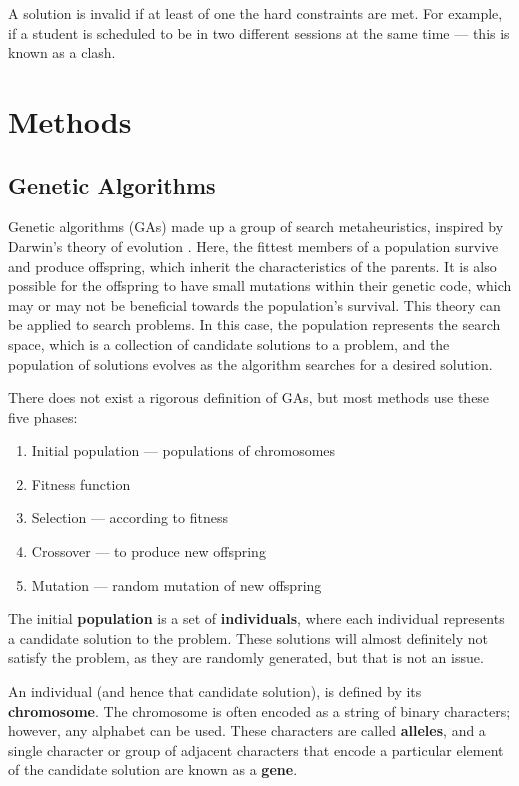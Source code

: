 \documentclass[a4paper, 12pt]{report}
\begin{document}
A solution is invalid if at least of one the hard constraints are met.
For example, if a student is scheduled to be in two different sessions at the
same time --- this is known as a clash.

\section{Methods}

\subsection{Genetic Algorithms}

Genetic algorithms (GAs) made up a group of search metaheuristics, inspired by
Darwin's theory of evolution \cite{ga_mitchell}.
Here, the fittest members of a population survive and produce offspring, which
inherit the characteristics of the parents.
It is also possible for the offspring to have small mutations within their
genetic code, which may or may not be beneficial towards the population's
survival.
This theory can be applied to search problems.
In this case, the population represents the search space, which is a collection 
of candidate solutions to a problem, and the population of solutions evolves as
the algorithm searches for a desired solution.

There does not exist a rigorous definition of GAs, but most methods use these
five phases:

\begin{enumerate}
	\item Initial population --- populations of chromosomes
	\item Fitness function
	\item Selection --- according to fitness
	\item Crossover --- to produce new offspring
	\item Mutation --- random mutation of new offspring
\end{enumerate}

The initial \textbf{population} is a set of \textbf{individuals}, where each
individual represents a candidate solution to the problem.
These solutions will almost definitely not satisfy the problem, as they are
randomly generated, but that is not an issue.

An individual (and hence that candidate solution), is defined by its
\textbf{chromosome}.
The chromosome is often encoded as a string of binary characters; however, any
alphabet can be used.
These characters are called \textbf{alleles}, and a single character or group of
adjacent characters that encode a particular element of the candidate solution
are known as a \textbf{gene}.
\end{document}

